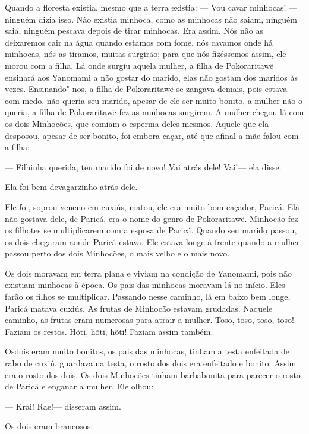  

 Quando a floresta existia, mesmo que a terra
existia: 
--- Vou cavar minhocas! --- ninguém dizia isso. 
Não existia minhoca, como as minhocas não saiam, ninguém saia, ninguém
pescava depois de tirar minhocas. Era assim. Nós não as deixaremos cair
na água quando estamos com fome, nós cavamos onde há minhocas, nós as
tiramos, muitas surgirão; para que nós fizéssemos assim, ele morou com a
filha. Lá onde surgiu aquela mulher, a filha de Pokoraritawë ensinará
aos Yanomami a não gostar do marido, elas não gostam dos maridos às
vezes. Ensinando"-nos, a filha de Pokoraritawë se zangava demais, pois
estava com medo, não queria seu marido, apesar de ele ser muito bonito,
a mulher não o queria, a filha de Pokoraritawë fez as minhocas surgirem.
A mulher chegou lá com os dois Minhocões, que comiam o esperma deles
mesmos. Aquele que ela desposou, apesar de ser bonito, foi embora caçar,
até que afinal a mãe falou com a filha: 

--- Filhinha querida, teu marido foi de novo! Vai atrás dele! Vai!---
ela disse. 

Ela foi bem devagarzinho atrás dele. 

Ele foi, soprou veneno em cuxiús, matou, ele era muito bom caçador,
Paricá. Ela não gostava dele, de Paricá, era o nome do genro de
Pokoraritawë. Minhocão fez os filhotes se multiplicarem com a esposa de
Paricá. Quando seu marido passou, os dois chegaram aonde Paricá estava.
Ele estava longe à frente quando a mulher passou perto dos dois
Minhocões, o mais velho e o mais novo. 

Os dois moravam em terra plana e viviam na condição de Yanomami, pois
não existiam minhocas à época. Os pais das minhocas moravam lá no
início. Eles farão os filhos se multiplicar. Passando nesse caminho, lá
em baixo bem longe, Paricá matava cuxiús. As frutas de Minhocão estavam
grudadas. Naquele caminho, as frutas eram numerosas para atrair a
mulher. Toso, toso, toso, toso! Faziam os restos. Hõti, hõti, hõti!
Faziam assim também. 

Osdois eram muito bonitos, os pais das minhocas, tinham a testa
enfeitada de rabo de cuxiú, guardava na testa, o rosto dos dois era
enfeitado e bonito. Assim era o rosto dos dois. Os dois Minhocões tinham
barbabonita para parecer o rosto de Paricá e enganar a mulher. Ele
olhou: 

--- Krai! Rae!--- disseram assim. 

Os dois eram brancosos: 

